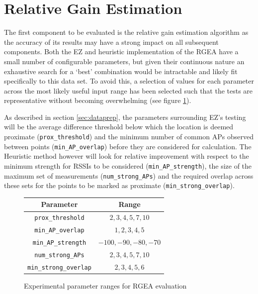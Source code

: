 \documentclass{UoYCSproject}
\begin{document}
	    \section{Relative Gain Estimation}
	    \label{sec:rgeaeval}
        
            The first component to be evaluated is the relative gain estimation algorithm as the accuracy of its results may have a strong impact on all subsequent components. Both the EZ and heuristic implementation of the RGEA have a small number of configurable parameters, but given their continuous nature an exhaustive search for a `best' combination would be intractable and likely fit specifically to this data set. To avoid this, a selection of values for each parameter across the most likely useful input range has been selected such that the tests are representative without becoming overwhelming (see figure \ref{fig:rgeaparams}). 
            
            As described in section \ref{sec:dataprep}, the parameters surrounding EZ's testing will be the average difference threshold below which the location is deemed proximate (\texttt{prox\_threshold}) and the minimum number of common APs observed between points (\texttt{min\_AP\_overlap}) before they are considered for calculation. The Heuristic method however will look for relative improvement with respect to the minimum strength for RSSIs to be considered (\texttt{min\_AP\_strength}), the size of the maximum set of measurements (\texttt{num\_strong\_APs}) and the required overlap across these sets for the points to be marked as proximate (\texttt{min\_strong\_overlap}).
            
            \begin{figure}
                \label{fig:rgeaparams}
                \centering
                \begin{tabular}[h]{| c | c |}
                    \hline
                    Parameter & Range \\ \hline
                    \texttt{prox\_threshold} & $2, 3, 4, 5, 7, 10$ \\
                    \texttt{min\_AP\_overlap} & $1, 2, 3, 4, 5$ \\ \hline
                    \texttt{min\_AP\_strength} & $-100, -90, -80, -70$ \\
                    \texttt{num\_strong\_APs} & $2, 3, 4, 5, 7, 10$ \\
                    \texttt{min\_strong\_overlap} & $2, 3, 4, 5, 6$ \\ \hline
                \end{tabular}
                \caption{Experimental parameter ranges for RGEA evaluation}
            \end{figure}
            
\end{document}
